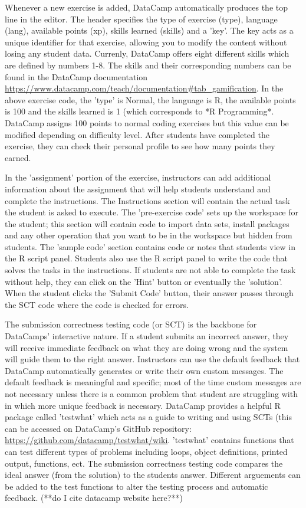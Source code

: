 \documentclass[12pt]{article}
\begin{document}
Whenever a new exercise is added, DataCamp automatically produces the top line in the editor. The header specifies the type
of exercise (type), language (lang), available points (xp), skills learned (skills) and a 'key'. The key acts as a unique
identifier for that exercise, allowing you to modify the content without losing any student data. Currenly, DataCamp offers
eight different skills which are defined by numbers 1-8. The skills and their corresponding numbers can be found in the DataCamp
documentation \url{https://www.datacamp.com/teach/documentation#tab_gamification}. 
In the above exercise code, the 'type' is Normal, the language is R, the available points is 100 and the skills learned is 1 (which 
corresponds to *R Programming*. DataCamp assigns 100 points to normal coding exercises but this value can be modified depending on
difficulty level. After students have completed the exercise, they can check their personal profile to see how many points they earned.

In the 'assignment' portion of the exercise, instructors can add additional information about the assignment that will help
students understand and complete the instructions. The Instructions section will contain the actual task the student is
asked to execute. The 'pre-exercise code' sets up the workspace for the student; this section will contain code to import
data sets, install packages and any other operation that you want to be in the workspace but hidden from students. The 'sample
code' section contains code or notes that students view in the R script panel. Students also use the R script panel to write
the code that solves the tasks in the instructions. If students are not able to complete the task without help, they can click
on the 'Hint' button or eventually the 'solution'. When the student clicks the 'Submit Code' button, their answer passes through
the SCT code where the code is checked for errors.


The submission correctness testing code (or SCT) is the backbone for DataCamps' interactive nature. If a student submits an incorrect answer, they will 
receive immediate feedback on what they are doing wrong and the system will guide them to the right answer. Instructors can use the default feedback
that DataCamp automatically generates or write their own custom messages. The default feedback is meaningful and specific; most of the time custom 
messages are not necessary unless there is a common problem that student are struggling with in which more unique feedback is necessary. 
DataCamp provides a helpful R package called 'testwhat' which acts as a guide to writing and using SCTs (this can be accessed on DataCamp's GitHub 
repository: \url{https://github.com/datacamp/testwhat/wiki}. 
'testwhat' contains functions that can test different types of problems including loops, object definitions, printed output, functions, ect.
The submission correctness testing code compares the ideal answer (from the solution) to the students answer. Different
arguements can be added to the test functions to alter the testing process and automatic feedback. (**do I cite datacamp website here?**)
\end{document}

